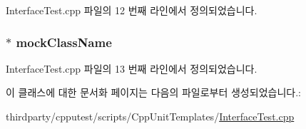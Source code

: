 Interface\+Test.\+cpp 파일의 12 번째 라인에서 정의되었습니다.

\subsubsection[{\texorpdfstring{mock\+Class\+Name}{mockClassName}}]{$\ast$ mock\+Class\+Name\hspace{0.3cm}{\ttfamily [private]}}\hypertarget{class_mock_class_name_test_a1f2ee9faa737933eb0f56751229bd13a}{}\label{class_mock_class_name_test_a1f2ee9faa737933eb0f56751229bd13a}


Interface\+Test.\+cpp 파일의 13 번째 라인에서 정의되었습니다.



이 클래스에 대한 문서화 페이지는 다음의 파일로부터 생성되었습니다.\+:\begin{DoxyCompactItemize}
\item 
thirdparty/cpputest/scripts/\+Cpp\+Unit\+Templates/\hyperlink{_cpp_unit_templates_2_interface_test_8cpp}{Interface\+Test.\+cpp}\end{DoxyCompactItemize}
